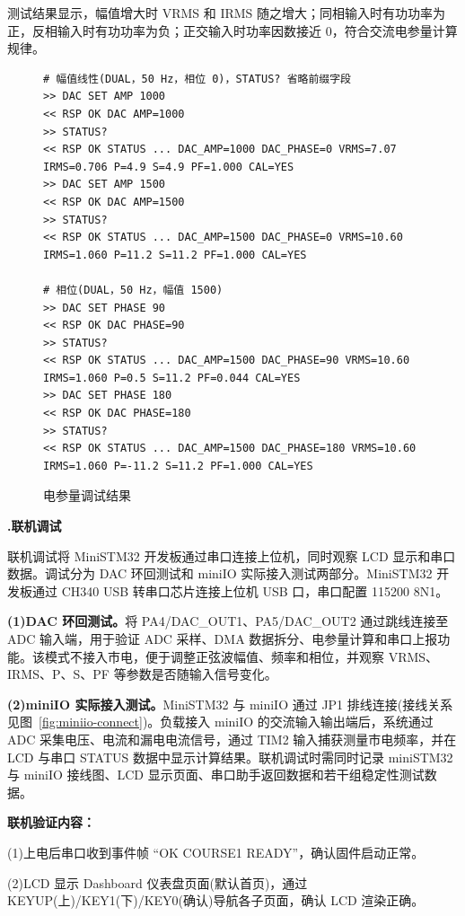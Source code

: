 \documentclass[UTF8,a4paper,zihao=-4,fontset=macnew]{ctexart}
\makeatletter
\def\@extractsubnum#1.#2\@nil{#2}
\newcommand{\subsectiontitle}[2]{%
  \setcounter{subsection}{\numexpr\@extractsubnum#1\@nil-1\relax}\refstepcounter{subsection}%
  \vspace{0.34cm}%
  {\noindent\heiti\bfseries\fontsize{16pt}{18pt}\selectfont #1.\quad #2\par}%
  \vspace{0.54cm}%
}
\makeatother
\begin{document}
测试结果显示，幅值增大时 VRMS 和 IRMS 随之增大；同相输入时有功功率为正，反相输入时有功功率为负；正交输入时功率因数接近 0，符合交流电参量计算规律。

\begin{figure}[H]
\centering
\begin{lstlisting}[style=serialterm]
# 幅值线性(DUAL，50 Hz，相位 0)，STATUS? 省略前缀字段
>> DAC SET AMP 1000
<< RSP OK DAC AMP=1000
>> STATUS?
<< RSP OK STATUS ... DAC_AMP=1000 DAC_PHASE=0 VRMS=7.07 IRMS=0.706 P=4.9 S=4.9 PF=1.000 CAL=YES
>> DAC SET AMP 1500
<< RSP OK DAC AMP=1500
>> STATUS?
<< RSP OK STATUS ... DAC_AMP=1500 DAC_PHASE=0 VRMS=10.60 IRMS=1.060 P=11.2 S=11.2 PF=1.000 CAL=YES

# 相位(DUAL，50 Hz，幅值 1500)
>> DAC SET PHASE 90
<< RSP OK DAC PHASE=90
>> STATUS?
<< RSP OK STATUS ... DAC_AMP=1500 DAC_PHASE=90 VRMS=10.60 IRMS=1.060 P=0.5 S=11.2 PF=0.044 CAL=YES
>> DAC SET PHASE 180
<< RSP OK DAC PHASE=180
>> STATUS?
<< RSP OK STATUS ... DAC_AMP=1500 DAC_PHASE=180 VRMS=10.60 IRMS=1.060 P=-11.2 S=11.2 PF=1.000 CAL=YES
\end{lstlisting}
\caption{电参量调试结果}
\label{fig:debug-calc}
\end{figure}

\subsectiontitle{7.5}{联机调试}
\label{sec:debug-online}

联机调试将 MiniSTM32 开发板通过串口连接上位机，同时观察 LCD 显示和串口数据。调试分为 DAC 环回测试和 miniIO 实际接入测试两部分。MiniSTM32 开发板通过 CH340 USB 转串口芯片连接上位机 USB 口，串口配置 115200 8N1。

\textbf{(1)DAC 环回测试。}将 PA4/DAC\_OUT1、PA5/DAC\_OUT2 通过跳线连接至 ADC 输入端，用于验证 ADC 采样、DMA 数据拆分、电参量计算和串口上报功能。该模式不接入市电，便于调整正弦波幅值、频率和相位，并观察 VRMS、IRMS、P、S、PF 等参数是否随输入信号变化。

\textbf{(2)miniIO 实际接入测试。}MiniSTM32 与 miniIO 通过 JP1 排线连接(接线关系见图~\ref{fig:miniio-connect})。负载接入 miniIO 的交流输入输出端后，系统通过 ADC 采集电压、电流和漏电电流信号，通过 TIM2 输入捕获测量市电频率，并在 LCD 与串口 STATUS 数据中显示计算结果。联机调试时需同时记录 miniSTM32 与 miniIO 接线图、LCD 显示页面、串口助手返回数据和若干组稳定性测试数据。

\textbf{联机验证内容：}

(1)上电后串口收到事件帧 ``OK COURSE1 READY''，确认固件启动正常。

(2)LCD 显示 Dashboard 仪表盘页面(默认首页)，通过 KEYUP(上)/KEY1(下)/KEY0(确认)导航各子页面，确认 LCD 渲染正确。
\end{document}

